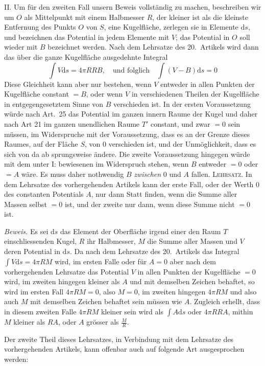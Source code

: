 II. Um für den zweiten Fall unsern Beweis vollständig zu machen, beschreiben wir um $O$ als Mittelpunkt mit einem Halbmesser $R$, der kleiner ist als die kleinste Entfernung des Punkts $O$ von $S$, eine Kugelfläche, zerlegen sie in Elemente $\mathrm ds$, und bezeichnen das Potential in jedem Elemente mit $V$; das Potential in $O$ soll wieder mit $B$ bezeichnet werden. Nach dem Lehrsatze des 20.\ Artikels wird dann das über die ganze Kugelfläche ausgedehnte Integral
\[
\int V\mathrm ds=4\pi RRB,\quad\text{und folglich}\quad\int(V-B)\mathrm ds=0
\]
Diese Gleichheit kann aber nur bestehen, wenn $V$ entweder in allen Punkten der Kugelfläche constant $=B$, oder wenn $V$ in verschiedenen Theilen der Kugelfläche in entgegengesetztem Sinne von $B$ verschieden ist. In der ersten Voraussetzung würde nach Art.\ 25 das Potential im ganzen innern Raume der Kugel und daher nach Art 21 im ganzen unendlichen Raume $T'$ constant, und zwar $=0$ sein müssen, im Widerspruche mit der Voraussetzung, dass es an der Grenze dieses Raumes, auf der Fläche $S$, von $0$ verschieden ist, und der Unmöglichkeit, dass es sich von da ab sprungsweise ändere. Die zweite Voraussetzung hingegen würde mit dem unter I: bewiesenen im Widerspruch stehen, wenn $B$ entweder $=0$ oder $=A$ wäre. Es muss daher nothwendig $B$ \textit{zwischen} $0$ und $A$ fallen.
\textsc{Lehrsatz.} In dem Lehrsatze des vorhergehenden Artikels kann der erste Fall, oder der Werth $0$ des constanten Potentials $A$, nur dann Statt finden, wenn die Summe aller Massen selbst $=0$ ist, und der zweite nur dann, wenn diese Summe nicht $=0$ ist.

\textit{Beweis.} Es sei $\mathrm ds$ das Element der Oberfläche irgend einer den Raum $T$ einschliessenden Kugel, $R$ ihr Halbmesser, $M$ die Summe aller Massen und $V$ deren Potential in $\mathrm ds$. Da nach dem Lehrsatze des 20.\ Artikels das Integral $\int V\mathrm ds=4\pi RM$ wird, im ersten Falle oder für $A=0$ aber nach dem vorhergehenden Lehrsatze das Potential $V$ in allen Punkten der Kugelfläche $=0$ wird, im zweiten hingegen kleiner als $A$ und mit demselben Zeichen behaftet, so wird im ersten Fall $4\pi RM=0$, also $M=0$, im zweiten hingegen $4\pi RM$ und also auch $M$ mit demselben Zeichen behaftet sein müssen wie $A$. Zugleich erhellt, dass in diesem zweiten Falle $4\pi RM$ kleiner sein wird als $\int A\mathrm ds$ oder $4\pi RRA$, mithin $M$ kleiner als $RA$, oder $A$ grösser als $\frac{M}{R}$.

Der zweite Theil dieses Lehrsatzes, in Verbindung mit dem Lehrsatze des vorhergehenden Artikels, kann offenbar auch auf folgende Art ausgesprochen werden:

